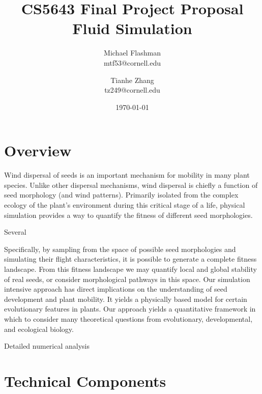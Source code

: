 \documentclass[11pt]{article}
\begin{document}
\title{CS5643 Final Project Proposal \\ Fluid Simulation}
\author{Michael Flashman \\ mtf53@cornell.edu \and Tianhe Zhang \\ tz249@cornell.edu\\}
\date{\today}
\maketitle



\section{Overview}




Wind dispersal of  seeds is an important mechanism for mobility in many plant species.  Unlike other dispersal mechanisms, wind dispersal is chiefly a function of seed morphology (and wind patterns).  Primarily isolated from the  complex ecology of the plant's environment during this critical stage of a life, physical simulation provides a way to  quantify the fitness of different seed morphologies.   

Several 


Specifically, by sampling from the space of possible seed morphologies and simulating their flight characteristics, it is possible to generate a complete fitness landscape.  From this fitness landscape we may quantify local and global stability of real seeds, or consider morphological pathways in this space.  Our simulation intensive approach has direct implications on the understanding of seed development and plant mobility.  It yields a physically based model for certain evolutionary features in plants.   Our approach yields a quantitative framework in which to consider many theoretical questions from evolutionary, developmental, and ecological biology.  

Detailed numerical analysis 




\section{Technical Components}



\begin{thebibliography}{11}


\end{thebibliography}
\end{document}

